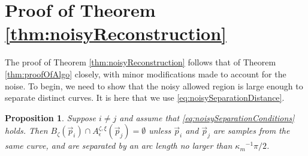 \documentclass{article}
\newtheorem{proposition}[cntr]{Proposition}
\numberwithin{cntr}{section}
\numberwithin{equation}{section}
\newcommand{\vp}[0]{{\vec{p}}}
\newcommand{\ball}[2]{ { B_{#1}(#2) } }
\newcommand{\curvemax}{{\kappa_{m}}}
\newcommand{\curvemaxi}{{\curvemax^{-1}}}
\newcommand{\pointNoise}{{\zeta}}
\newcommand{\tanNoise}{{\xi}}
\newcommand{\nallowed}[2]{ { A^{\pointNoise, \tanNoise}_{#1}(#2) } }
\begin{document}
\appendix

\section{Proof of Theorem \ref{thm:noisyReconstruction}}
\label{sec:proofOfNoisyReconstruction}
The proof of Theorem \ref{thm:noisyReconstruction} follows that of
Theorem \ref{thm:proofOfAlgo} closely, with minor modifications
made to account for the noise.
To begin, we need to show that the noisy allowed region is large enough
to separate distinct curves. It is here that we use
\eqref{eq:noisySeparationDistance}.

\begin{proposition}
  Suppose $i \neq j$ and assume that
  \eqref{eq:noisySeparationConditions} holds.
  Then $\ball{\pointNoise}{\vp_{i}} \cap
  \nallowed{\epsilon}{\vp_{j}} = \emptyset$ unless $\vp_{i}$ and $\vp_{j}$
  are samples from the same curve, and are separated by an arc length no
  larger than $\curvemaxi \pi/2$.
\end{proposition}
\end{document}
